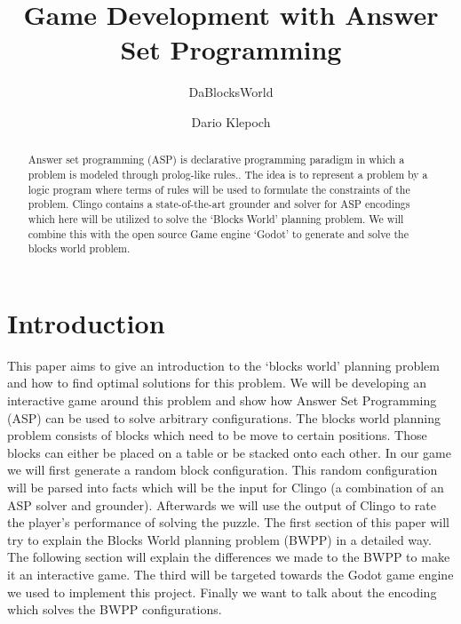 \documentclass[runningheads]{llncs}
\begin{document}
\lstset{
    language=prolog,
    autogobble=true,
    numbers=left
}

\title{Game Development with Answer Set Programming}
\subtitle{DaBlocksWorld}
\author{Dario Klepoch}
\maketitle        

    \begin{abstract}
        Answer set programming (ASP) is declarative programming paradigm in which a problem is modeled through prolog-like rules..
        The idea is to represent a problem by a logic program where terms of rules will be used to formulate the constraints of the problem.
        Clingo contains a state-of-the-art grounder and solver for ASP encodings
        which here will be utilized to solve the `Blocks World' planning problem.
        We will combine this with the open source Game engine `Godot' to generate and solve the blocks world problem.
    \end{abstract}


    \section{Introduction}
        This paper aims to give an introduction to the `blocks world' planning problem and how to find optimal solutions for this problem.
        We will be developing an interactive game around this problem and show how Answer Set Programming (ASP) can
        be used to solve arbitrary configurations.\newline
        The blocks world planning problem consists of blocks which need to be move to certain positions.
        Those blocks can either be placed on a table or be stacked onto each other.
        In our game we will first generate a random block configuration.
        This random configuration will be parsed into facts which will be the input for Clingo (a combination of an ASP solver and grounder).
        Afterwards we will use the output of Clingo to rate the player's performance of solving the puzzle.\newline
        The first section of this paper will try to explain the Blocks World planning problem (BWPP) in a detailed way.
        The following section will explain the differences we made to the BWPP to make it an interactive game.
        The third will be targeted towards the Godot game engine we used to implement this project.
        Finally we want to talk about the encoding which solves the BWPP configurations.
\end{document}
